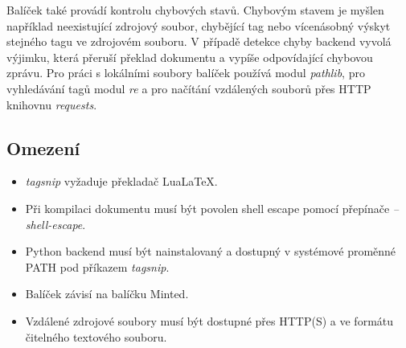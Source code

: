 \documentclass{article}
\begin{document}
Balíček také provádí kontrolu chybových stavů. Chybovým stavem je myšlen například
neexistující zdrojový soubor, chybějící tag nebo vícenásobný výskyt stejného tagu ve zdrojovém souboru.
V případě detekce chyby backend vyvolá výjimku, která přeruší překlad dokumentu
a vypíše odpovídající chybovou zprávu.
Pro práci s lokálními soubory balíček používá modul \textit{pathlib},
pro vyhledávání tagů modul \textit{re}
a pro načítání vzdálených souborů přes HTTP knihovnu \textit{requests}.

\subsection*{Omezení}

\begin{itemize}
    \item \textit{tagsnip} vyžaduje překladač Lua\LaTeX{}.
    
    \item Při kompilaci dokumentu musí být povolen shell escape
    pomocí přepínače \textit{--shell-escape}.

    \item Python backend musí být nainstalovaný a dostupný v systémové proměnné PATH
    pod příkazem \textit{tagsnip}.

    \item Balíček závisí na balíčku Minted.

    \item Vzdálené zdrojové soubory musí být dostupné přes HTTP(S)
    a ve formátu čitelného textového souboru.
\end{itemize}



\end{document}
